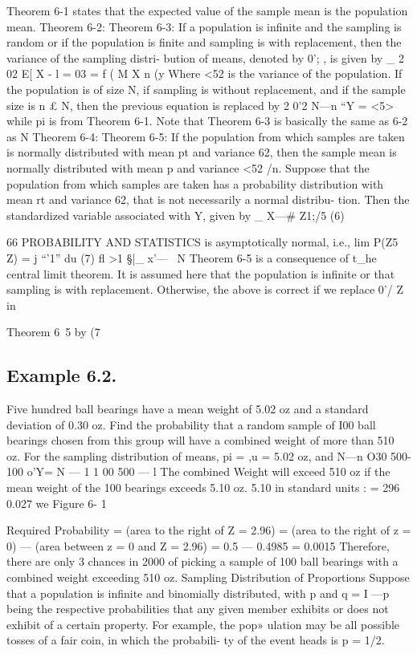Theorem 6-1 states that the expected value of the sample mean is
the population mean.
Theorem 6-2:
Theorem 6-3:
If a population is inﬁnite and the sampling is random
or if the population is ﬁnite and sampling is with
replacement, then the variance of the sampling distri-
bution of means, denoted by 0'; , is given by
_ 2 02
E[ X - l = 03 = f
( M X n (y
Where <52 is the variance of the population.
If the population is of size N, if sampling is without
replacement, and if the sample size is n £ N, then the
previous equation is replaced by
2 0'2 N—n
“Y =  <5>
while pi is from Theorem 6-1.
Note that Theorem 6-3 is basically the same as 6-2 as N %
Theorem 6-4:
Theorem 6-5:
If the population from which samples are taken is
normally distributed with mean pt and variance 62,
then the sample mean is normally distributed with
mean p and variance <52 /n.
Suppose that the population from which samples are
taken has a probability distribution with mean rt and
variance 62, that is not necessarily a normal distribu-
tion. Then the standardized variable associated with
Y, given by
_ X—#
Z1;/5 (6)



66 PROBABILITY AND STATISTICS
is asymptotically normal, i.e.,
lim P(Z5 Z) = j “'1” du (7)
ﬂ%
>1
§|_
x'—~
N
Theorem 6-5 is a consequence of t_he central limit theorem. It is
assumed here that the population is inﬁnite or that sampling is with
replacement. Otherwise, the above is correct if we replace 0'/ \/Z in

Theorem 6~5 by (7%

\subsection{Example 6.2.}
Five hundred ball bearings have a mean weight of 5.02 oz and a standard deviation of 0.30 oz. Find the probability that a
random sample of I00 ball bearings chosen from this group will have a
combined weight of more than 510 oz.
For the sampling distribution of means, pi = ,u = 5.02 oz, and
N—n O30 500-100
o'Y=%
N — 1 1 00 500 — l
The combined Weight will exceed 510 oz if the mean weight of the 100
bearings exceeds 5.10 oz.
5.10 in standard units :  = 296
0.027
we
Figure 6- 1


Required Probability = (area to the right of Z = 2.96)
= (area to the right of z = 0) —
(area between z = 0 and Z = 2.96)
= 0.5 — 0.4985 = 0.0015
Therefore, there are only 3 chances in 2000 of picking a sample of 100
ball bearings with a combined weight exceeding 510 oz.
Sampling Distribution of Proportions
Suppose that a population is inﬁnite and binomially distributed, with p
and q = I —p being the respective probabilities that any given member
exhibits or does not exhibit of a certain property. For example, the pop»
ulation may be all possible tosses of a fair coin, in which the probabili-
ty of the event heads is p = 1/2.

